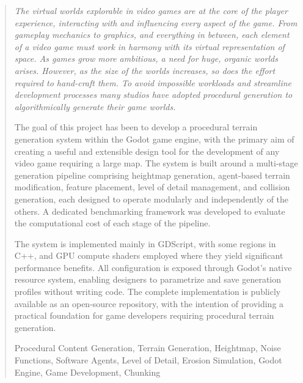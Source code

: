 \documentclass[english,a4paper,12pt,oneside]{extreport}
\newenvironment{keywords}
{\begin{list}{}{\setlength{\leftmargin}{1em}}\item[\hskip\labelsep \bfseries Keywords:]}
{\end{list}}
\begin{document}
\newpage  %
\begin{abstract}
{\em
The virtual worlds explorable in video games are at the core of the player experience, interacting with and influencing every aspect of the game. 
From gameplay mechanics to graphics, and everything in between, each element of a video game must work in harmony with its virtual representation of space. 
As games grow more ambitious, a need for huge, organic worlds arises.
However, as the size of the worlds increases, so does the effort required to hand-craft them.
To avoid impossible workloads and streamline development processes many studios have adopted procedural generation to algorithmically generate their game worlds.

The goal of this project has been to develop a procedural terrain generation system within the Godot game engine, with the primary aim of creating a useful and extensible design tool for the development of any video game requiring a large map.
The system is built around a multi-stage generation pipeline comprising heightmap generation, agent-based terrain modification, feature placement, level of detail management, and collision generation, each designed to operate modularly and independently of the others.
A dedicated benchmarking framework was developed to evaluate the computational cost of each stage of the pipeline.

The system is implemented mainly in GDScript, with some regions in C++, and GPU compute shaders employed where they yield significant performance benefits. 
All configuration is exposed through Godot's native resource system, enabling designers to parametrize and save generation profiles without writing code. 
The complete implementation is publicly available as an open-source repository, with the intention of providing a practical foundation for game developers requiring procedural terrain generation.
}

\begin{keywords}
Procedural Content Generation, Terrain Generation, Heightmap, Noise Functions, Software Agents, Level of Detail, Erosion Simulation, Godot Engine, Game Development, Chunking
\end{keywords}

\end{abstract}
\newpage{\pagestyle{empty}}
\thispagestyle{empty}
\end{document}
